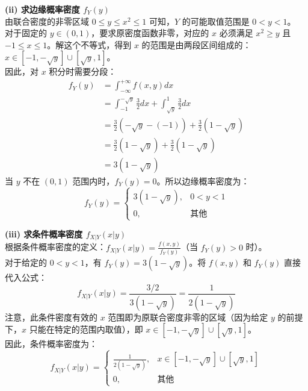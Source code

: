 \vspace{0.5em}
\textbf{(ii) 求边缘概率密度 $f_Y(y)$} \\
由联合密度的非零区域 $0 \le y \le x^2 \le 1$ 可知，$Y$ 的可能取值范围是 $0 < y < 1$。\\
对于固定的 $y \in (0,1)$，要求原密度函数非零，对应的 $x$ 必须满足 $x^2 \ge y$ 且 $-1 \le x \le 1$。解这个不等式，得到 $x$ 的范围是由两段区间组成的：$x \in [-1, -\sqrt{y}] \cup [\sqrt{y}, 1]$。\\
因此，对 $x$ 积分时需要分段：
$$ 
\begin{aligned}
f_Y(y) &= \int_{-\infty}^{+\infty} f(x,y) dx \\
&= \int_{-1}^{-\sqrt{y}} \frac{3}{2} dx + \int_{\sqrt{y}}^{1} \frac{3}{2} dx \\
&= \frac{3}{2}(-\sqrt{y} - (-1)) + \frac{3}{2}(1 - \sqrt{y}) \\
&= \frac{3}{2}(1 - \sqrt{y}) + \frac{3}{2}(1 - \sqrt{y}) \\
&= 3(1 - \sqrt{y})
\end{aligned}
$$
当 $y$ 不在 $(0, 1)$ 范围内时，$f_Y(y) = 0$。所以边缘概率密度为：
$$ f_Y(y) = \begin{cases} 3(1 - \sqrt{y}), & 0 < y < 1 \\ 0, & \text{其他} \end{cases} $$

\vspace{0.5em}
\textbf{(iii) 求条件概率密度 $f_{X|Y}(x|y)$} \\
根据条件概率密度的定义：$f_{X|Y}(x|y) = \frac{f(x,y)}{f_Y(y)}$（当 $f_Y(y) > 0$ 时）。\\
对于给定的 $0 < y < 1$，有 $f_Y(y) = 3(1 - \sqrt{y})$。将 $f(x,y)$ 和 $f_Y(y)$ 直接代入公式：
$$ f_{X|Y}(x|y) = \frac{3/2}{3(1 - \sqrt{y})} = \frac{1}{2(1 - \sqrt{y})} $$
注意，此条件密度有效的 $x$ 范围即为原联合密度非零的区域（因为给定 $y$ 的前提下，$x$ 只能在特定的范围内取值），即 $x \in [-1, -\sqrt{y}] \cup [\sqrt{y}, 1]$。\\
因此，条件概率密度为：
$$ f_{X|Y}(x|y) = \begin{cases} \frac{1}{2(1 - \sqrt{y})}, & x \in [-1, -\sqrt{y}] \cup [\sqrt{y}, 1] \\ 0, & \text{其他} \end{cases} $$